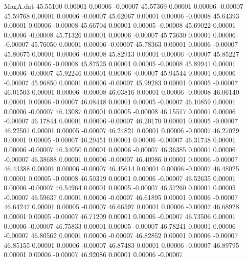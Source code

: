 \begin{filecontents}{MagA.dat}
  45.55100    0.00001    0.00006   -0.00007
  45.57369    0.00001    0.00006   -0.00007
  45.59768    0.00001    0.00006   -0.00007
  45.62067    0.00001    0.00006   -0.00008
  45.64393    0.00001    0.00006   -0.00008
  45.66704    0.00001    0.00005   -0.00008
  45.69022    0.00001    0.00006   -0.00008
  45.71326    0.00001    0.00006   -0.00007
  45.73630    0.00001    0.00006   -0.00007
  45.76050    0.00001    0.00006   -0.00007
  45.78363    0.00001    0.00006   -0.00007
  45.80675    0.00001    0.00006   -0.00008
  45.82913    0.00001    0.00006   -0.00007
  45.85227    0.00001    0.00006   -0.00008
  45.87525    0.00001    0.00005   -0.00008
  45.89941    0.00001    0.00006   -0.00007
  45.92246    0.00001    0.00006   -0.00007
  45.94544    0.00001    0.00006   -0.00007
  45.96850    0.00001    0.00006   -0.00007
  45.99283    0.00001    0.00005   -0.00007
  46.01503    0.00001    0.00006   -0.00008
  46.03816    0.00001    0.00006   -0.00008
  46.06140    0.00001    0.00006   -0.00007
  46.08448    0.00001    0.00005   -0.00007
  46.10859    0.00001    0.00006   -0.00007
  46.13087    0.00001    0.00005   -0.00008
  46.15517    0.00001    0.00006   -0.00007
  46.17844    0.00001    0.00006   -0.00007
  46.20170    0.00001    0.00005   -0.00007
  46.22501    0.00001    0.00005   -0.00007
  46.24821    0.00001    0.00006   -0.00007
  46.27029    0.00001    0.00005   -0.00007
  46.29451    0.00001    0.00006   -0.00007
  46.31748    0.00001    0.00006   -0.00007
  46.34050    0.00001    0.00006   -0.00007
  46.36385    0.00001    0.00006   -0.00007
  46.38688    0.00001    0.00006   -0.00007
  46.40986    0.00001    0.00006   -0.00007
  46.43388    0.00001    0.00006   -0.00007
  46.45614    0.00001    0.00006   -0.00007
  46.48025    0.00001    0.00005   -0.00008
  46.50319    0.00001    0.00006   -0.00007
  46.52635    0.00001    0.00006   -0.00007
  46.54964    0.00001    0.00005   -0.00007
  46.57260    0.00001    0.00005   -0.00007
  46.59637    0.00001    0.00006   -0.00007
  46.61895    0.00001    0.00006   -0.00007
  46.64247    0.00001    0.00005   -0.00007
  46.66597    0.00001    0.00006   -0.00007
  46.68928    0.00001    0.00005   -0.00007
  46.71209    0.00001    0.00006   -0.00007
  46.73506    0.00001    0.00006   -0.00007
  46.75833    0.00001    0.00005   -0.00007
  46.78241    0.00001    0.00006   -0.00007
  46.80562    0.00001    0.00006   -0.00007
  46.82852    0.00001    0.00006   -0.00007
  46.85155    0.00001    0.00006   -0.00007
  46.87483    0.00001    0.00006   -0.00007
  46.89795    0.00001    0.00006   -0.00007
  46.92086    0.00001    0.00006   -0.00007

\end{filecontents}
